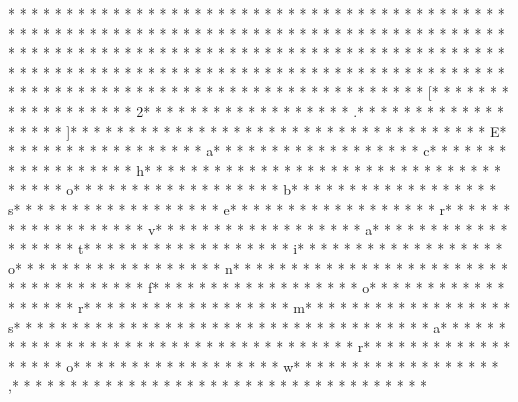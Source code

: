 * * *  * * *  * * *  *  * * *  *  * * *  * 	* * *  * * *  * * *  *  * * *  *  * * *  * 	* * *  * * *  * * *  *  * * *  *  * * *  * 	* * *  * * *  * * *  *  * * *  *  * * *  * * *  * * *  *  * * *  *  * * *  * * *  * * *  *  * * *  *  * * *  *  * * *  * * *  * * *  *  * * *  *  * * *  *  * * *  * * *  * * *  *  * * *  *  * * *  *  * * *  * * *  * * *  *  * * *  *  * * *  *  * * *  * * *  * * *  *  * * *  *  * * *  *  * * *  * * *  * * *  *  * * *  *  * * *  *  * * *  * * *  * * *  *  * * *  *  * * *  * [* * *  * * *  * * *  *  * * *  *  * * *  * 2* * *  * * *  * * *  *  * * *  *  * * *  * .* * *  * * *  * * *  *  * * *  *  * * *  * ]* * *  * * *  * * *  *  * * *  *  * * *  *  * * *  * * *  * * *  *  * * *  *  * * *  * E* * *  * * *  * * *  *  * * *  *  * * *  * a* * *  * * *  * * *  *  * * *  *  * * *  * c* * *  * * *  * * *  *  * * *  *  * * *  * h* * *  * * *  * * *  *  * * *  *  * * *  *  * * *  * * *  * * *  *  * * *  *  * * *  * o* * *  * * *  * * *  *  * * *  *  * * *  * b* * *  * * *  * * *  *  * * *  *  * * *  * s* * *  * * *  * * *  *  * * *  *  * * *  * e* * *  * * *  * * *  *  * * *  *  * * *  * r* * *  * * *  * * *  *  * * *  *  * * *  * v* * *  * * *  * * *  *  * * *  *  * * *  * a* * *  * * *  * * *  *  * * *  *  * * *  * t* * *  * * *  * * *  *  * * *  *  * * *  * i* * *  * * *  * * *  *  * * *  *  * * *  * o* * *  * * *  * * *  *  * * *  *  * * *  * n* * *  * * *  * * *  *  * * *  *  * * *  *  * * *  * * *  * * *  *  * * *  *  * * *  * f* * *  * * *  * * *  *  * * *  *  * * *  * o* * *  * * *  * * *  *  * * *  *  * * *  * r* * *  * * *  * * *  *  * * *  *  * * *  * m* * *  * * *  * * *  *  * * *  *  * * *  * s* * *  * * *  * * *  *  * * *  *  * * *  *  * * *  * * *  * * *  *  * * *  *  * * *  * a* * *  * * *  * * *  *  * * *  *  * * *  *  * * *  * * *  * * *  *  * * *  *  * * *  * r* * *  * * *  * * *  *  * * *  *  * * *  * o* * *  * * *  * * *  *  * * *  *  * * *  * w* * *  * * *  * * *  *  * * *  *  * * *  * ,* * *  * * *  * * *  *  * * *  *  * * *  *  * * *  * * *  * * *  *  * * *  *  * * *  * 
